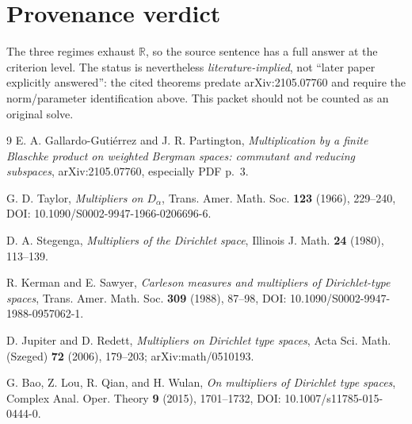 \documentclass[11pt]{article}
\begin{document}
\section{Provenance verdict}

The three regimes exhaust $\mathbb R$, so the source sentence has a full answer
at the criterion level. The status is nevertheless \emph{literature-implied},
not ``later paper explicitly answered'': the cited theorems predate
arXiv:2105.07760 and require the norm/parameter identification above. This
packet should not be counted as an original solve.

\small
\begin{thebibliography}{9}
E. A. Gallardo-Guti\'errez and J. R. Partington,
\emph{Multiplication by a finite Blaschke product on weighted Bergman spaces:
commutant and reducing subspaces}, arXiv:2105.07760, especially PDF p.~3.

G. D. Taylor, \emph{Multipliers on $D_\alpha$},
Trans. Amer. Math. Soc. \textbf{123} (1966), 229--240,
DOI: 10.1090/S0002-9947-1966-0206696-6.

D. A. Stegenga, \emph{Multipliers of the Dirichlet space},
Illinois J. Math. \textbf{24} (1980), 113--139.

R. Kerman and E. Sawyer,
\emph{Carleson measures and multipliers of Dirichlet-type spaces},
Trans. Amer. Math. Soc. \textbf{309} (1988), 87--98,
DOI: 10.1090/S0002-9947-1988-0957062-1.

D. Jupiter and D. Redett, \emph{Multipliers on Dirichlet type spaces},
Acta Sci. Math. (Szeged) \textbf{72} (2006), 179--203;
arXiv:math/0510193.

G. Bao, Z. Lou, R. Qian, and H. Wulan,
\emph{On multipliers of Dirichlet type spaces},
Complex Anal. Oper. Theory \textbf{9} (2015), 1701--1732,
DOI: 10.1007/s11785-015-0444-0.
\end{thebibliography}
\end{document}
